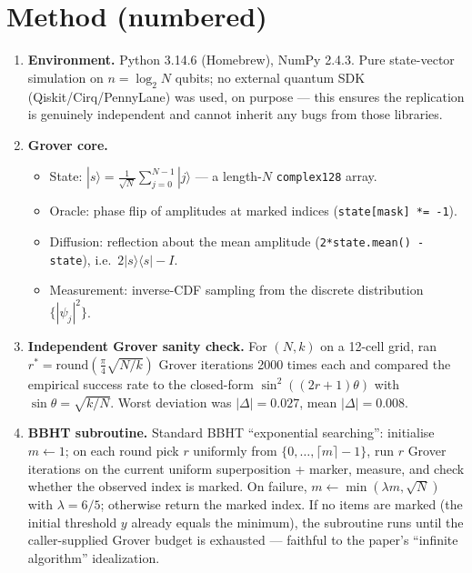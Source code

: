 \documentclass[11pt]{article}
\begin{document}
\section{Method (numbered)}

\begin{enumerate}
    \item \textbf{Environment.} Python 3.14.6 (Homebrew), NumPy 2.4.3.
    Pure state-vector simulation on $n = \log_2 N$ qubits; no external quantum SDK
    (Qiskit/Cirq/PennyLane) was used, on purpose --- this ensures the replication
    is genuinely independent and cannot inherit any bugs from those libraries.

    \item \textbf{Grover core.}
    \begin{itemize}
        \item State: $|s\rangle = \frac{1}{\sqrt{N}}\sum_{j=0}^{N-1}|j\rangle$
              --- a length-$N$ \verb|complex128| array.
        \item Oracle: phase flip of amplitudes at marked indices
              (\verb|state[mask] *= -1|).
        \item Diffusion: reflection about the mean amplitude
              (\verb|2*state.mean() - state|), i.e.\ $2|s\rangle\langle s| - I$.
        \item Measurement: inverse-CDF sampling from the discrete distribution
              $\{|\psi_j|^2\}$.
    \end{itemize}

    \item \textbf{Independent Grover sanity check.}
    For $(N,k)$ on a 12-cell grid, ran $r^* = \mathrm{round}(\tfrac{\pi}{4}\sqrt{N/k})$
    Grover iterations 2000 times each and compared the empirical success rate to
    the closed-form $\sin^2((2r+1)\theta)$ with $\sin\theta = \sqrt{k/N}$.
    Worst deviation was $|\Delta| = 0.027$, mean $|\Delta| = 0.008$.

    \item \textbf{BBHT subroutine.}
    Standard BBHT ``exponential searching'':
    initialise $m \gets 1$; on each round pick $r$ uniformly from
    $\{0, \dots, \lceil m \rceil - 1\}$, run $r$ Grover iterations on the current
    uniform superposition + marker, measure, and check whether the observed index is
    marked. On failure, $m \gets \min(\lambda m, \sqrt N)$ with $\lambda = 6/5$;
    otherwise return the marked index. If no items are marked (the initial threshold
    $y$ already equals the minimum), the subroutine runs until the caller-supplied
    Grover budget is exhausted --- faithful to the paper's ``infinite algorithm''
    idealization.


\end{enumerate}
\end{document}
